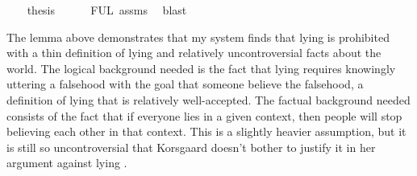 \begin{isabellebody}
\ \ \isamarkupfalse%
\ {\isacharquery}thesis\isanewline
\ \ \ \ \isamarkupfalse%
\ FUL\ assms{\isacharparenleft}{}{\isacharparenright}\ \isamarkupfalse%
\ blast\ \isanewline
%
\isanewline
{}\isamarkupfalse%
%
\endisatagproof
{\isafoldproof}%
%
\isadelimproof
%
\endisadelimproof
%
\begin{isamarkuptext}%
The lemma above demonstrates that my system finds that lying is prohibited with a thin definition
of lying and relatively uncontroversial facts about the world. The logical background needed is the fact that lying
requires knowingly uttering a falsehood with the goal that someone believe the falsehood, a definition
of lying that is relatively well-accepted. The factual background needed consists of the fact that if 
everyone lies in a given context, then people will stop believing each other in that context. This is 
a slightly heavier assumption, but it is still so uncontroversial that Korsgaard doesn't bother to justify
it in her argument against lying \citep{KorsgaardRTL}. 


\end{isamarkuptext}
\end{isabellebody}
